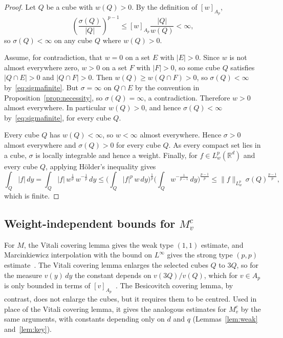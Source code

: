 \documentclass[12pt]{article}
\begin{document}
\begin{proof}
Let $Q$ be a cube with $w(Q) > 0$. By the definition of $[w]_{A_p}$,
\begin{equation}\label{eq:sigmafinite}
  \left( \frac{\sigma(Q)}{|Q|} \right)^{p-1} \le [w]_{A_p} \frac{|Q|}{w(Q)} < \infty,
\end{equation}
so $\sigma(Q) < \infty$ on any cube $Q$ where $w(Q) > 0$.

Assume, for contradiction, that $w = 0$ on a set $E$ with $|E| > 0$. Since $w$ is not almost everywhere zero, $w > 0$ on a set $F$ with $|F| > 0$, so some cube $Q$ satisfies $|Q \cap E| > 0$ and $|Q \cap F| > 0$. Then $w(Q) \ge w(Q \cap F) > 0$, so $\sigma(Q) < \infty$ by~\eqref{eq:sigmafinite}. But $\sigma = \infty$ on $Q \cap E$ by the convention in Proposition~\ref{prop:necessity}, so $\sigma(Q) = \infty$, a contradiction. Therefore $w > 0$ almost everywhere. In particular $w(Q) > 0$, and hence $\sigma(Q) < \infty$ by~\eqref{eq:sigmafinite}, for every cube $Q$.

Every cube $Q$ has $w(Q) < \infty$, so $w < \infty$ almost everywhere. Hence $\sigma > 0$ almost everywhere and $\sigma(Q) > 0$ for every cube $Q$. As every compact set lies in a cube, $\sigma$ is locally integrable and hence a weight. Finally, for $f \in L^p_w(\mathbb{R}^d)$ and every cube $Q$, applying H\"older's inequality gives
\[
  \int_Q |f|\,dy = \int_Q |f|\, w^{\frac{1}{p}}\, w^{-\frac{1}{p}}\,dy \le \Big( \int_Q |f|^p\, w\,dy \Big)^{\frac{1}{p}} \Big( \int_Q w^{-\frac{1}{p-1}}\,dy \Big)^{\frac{p-1}{p}} \le \|f\|_{L^p_w}\, \sigma(Q)^{\frac{p-1}{p}},
\]
which is finite.
\end{proof}

\subsection{Weight-independent bounds for \texorpdfstring{$M^c_v$}{the centred maximal operator}}\label{sec:weighted}

For $M$, the Vitali covering lemma gives the weak type $(1,1)$ estimate, and Marcinkiewicz interpolation with the bound on $L^\infty$ gives the strong type $(p,p)$ estimate~\cite[Sections~1.3.1 and~2.1.1]{GrafakosClassical}. The Vitali covering lemma enlarges the selected cubes $Q$ to $3Q$, so for the measure $v(y)\,dy$ the constant depends on $v(3Q)/v(Q)$, which for $v \in A_p$ is only bounded in terms of $[v]_{A_p}$~\cite[Remark~1.11]{Duoandikoetxea2013}. The Besicovitch covering lemma, by contrast, does not enlarge the cubes, but it requires them to be centred. Used in place of the Vitali covering lemma, it gives the analogous estimates for $M^c_v$ by the same arguments, with constants depending only on $d$ and $q$ (Lemmas~\ref{lem:weak} and~\ref{lem:key}).
\end{document}
